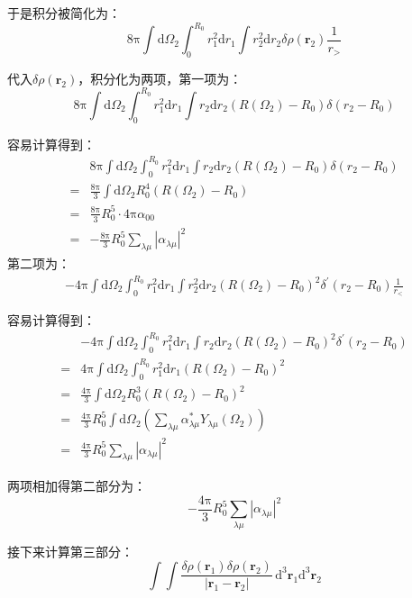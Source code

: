\begin{booknote*}
于是积分被简化为：
\[
8\mathrm{\pi}\int\mathrm{d}\Omega_{2}\int^{R_{0}}_{0}r^{2}_{1}\mathrm{d}r_{1}\int r^{2}_{2}\mathrm{d}r_{2}\delta\rho(\boldsymbol{r}_{2})\frac{1}{r_{>}}
\]

代入$\delta\rho(\boldsymbol{r}_{2})$，积分化为两项，第一项为：
\[
8\mathrm{\pi}\int\mathrm{d}\Omega_{2}\int^{R_{0}}_{0}r^{2}_{1}\mathrm{d}r_{1}\int r_{2}\mathrm{d}r_{2}(R(\Omega_{2})-R_{0})\delta(r_{2}-R_{0})
\]

容易计算得到：
\begin{align*}
 & 8\mathrm{\pi}\int\mathrm{d}\Omega_{2}\int^{R_{0}}_{0}r^{2}_{1}\mathrm{d}r_{1}\int r_{2}\mathrm{d}r_{2}(R(\Omega_{2})-R_{0})\delta(r_{2}-R_{0})\\
= & \frac{8\mathrm{\pi}}{3}\int\mathrm{d}\Omega_{2}R^{4}_{0}(R(\Omega_{2})-R_{0})\\
= & \frac{8\mathrm{\pi}}{3}R^{5}_{0}\cdot4\mathrm{\pi}\alpha_{00}\\
= & -\frac{8\mathrm{\pi}}{3}R^{5}_{0}\sum_{\lambda\mu}\left|\alpha_{\lambda\mu}\right|^{2}
\end{align*}
第二项为：
\begin{align*}
-4\mathrm{\pi}\int\mathrm{d}\Omega_{2}\int^{R_{0}}_{0}r^{2}_{1}\mathrm{d}r_{1}\int r^{2}_{2}\mathrm{d}r_{2}(R(\Omega_{2})-R_{0})^{2}\delta^{\prime}(r_{2}-R_{0})\frac{1}{r_{<}}
\end{align*}

容易计算得到：
\begin{align*}
 & -4\mathrm{\pi}\int\mathrm{d}\Omega_{2}\int^{R_{0}}_{0}r^{2}_{1}\mathrm{d}r_{1}\int r_{2}\mathrm{d}r_{2}(R(\Omega_{2})-R_{0})^{2}\delta^{\prime}(r_{2}-R_{0})\\
= & 4\mathrm{\pi}\int\mathrm{d}\Omega_{2}\int^{R_{0}}_{0}r^{2}_{1}\mathrm{d}r_{1}(R(\Omega_{2})-R_{0})^{2}\\
= & \frac{4\mathrm{\pi}}{3}\int\mathrm{d}\Omega_{2}R^{3}_{0}(R(\Omega_{2})-R_{0})^{2}\\
= & \frac{4\mathrm{\pi}}{3}R^{5}_{0}\int\mathrm{d}\Omega_{2}(\sum_{\lambda\mu}\alpha^{*}_{\lambda\mu}Y_{\lambda\mu}(\Omega_{2}))\\
= & \frac{4\mathrm{\pi}}{3}R^{5}_{0}\sum_{\lambda\mu}\left|\alpha_{\lambda\mu}\right|^{2}
\end{align*}

两项相加得第二部分为：
\[
-\frac{4\mathrm{\pi}}{3}R^{5}_{0}\sum_{\lambda\mu}\left|\alpha_{\lambda\mu}\right|^{2}
\]

接下来计算第三部分：
\[
\int\int\frac{\delta\rho(\boldsymbol{r}_{1})\delta\rho(\boldsymbol{r}_{2})}{\left|\boldsymbol{r}_{1}-\boldsymbol{r}_{2}\right|}\,\mathrm{d}^{3}\boldsymbol{r}_{1}\mathrm{d}^{3}\boldsymbol{r}_{2}
\]


\end{booknote*}
